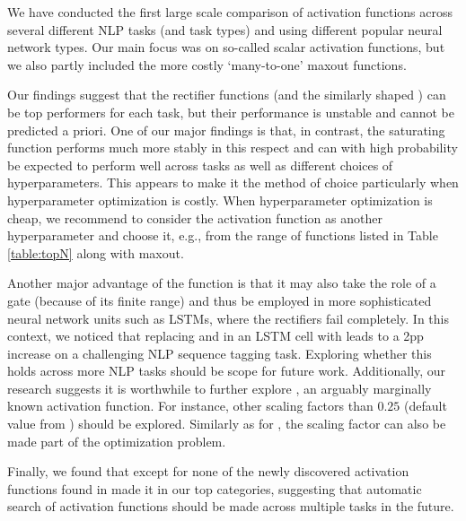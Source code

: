 %
We have conducted the first large scale comparison of activation functions across several different NLP tasks (and task types) and using different popular neural network types. 
Our main focus was on so-called scalar activation functions, but we also partly included the more costly `many-to-one' %
maxout functions. 

Our findings suggest that the rectifier functions (and the similarly shaped \swish{}) can be top performers for each task, but their performance is unstable and cannot be predicted a priori. One of our major findings is that, in contrast, the saturating \pentan{} function performs much more stably in this respect and can with high probability be expected to perform well across tasks as well as different choices of hyperparameters. This appears to make it the method of choice particularly when hyperparameter optimization is costly. When hyperparameter optimization is cheap, we recommend to consider the activation function as another hyperparameter and choose it, e.g., from the range of functions listed in Table \ref{table:topN} along with maxout. 

Another major advantage of the \pentan{} function is that it may also take the role of a gate (because of its finite range) and thus be employed in more sophisticated neural network units such as LSTMs, where the rectifiers fail completely. In this context, we noticed that replacing \sigmoid{} and \mytanh{} in an LSTM cell with \pentan{} leads to a 2pp increase on a challenging NLP sequence tagging task. Exploring whether this holds across more NLP tasks should be scope for future work. Additionally, our research suggests it is worthwhile to further explore \pentan{}, an arguably marginally known activation function. For instance, other scaling factors than $0.25$ (default value from \citet{Xu:2016}) should be explored. Similarly as for \prelu{}, the scaling factor can also be made part of the optimization problem. 

Finally, we found that except for \swish{} none of the newly discovered activation functions found in \citet{Ramach:2018} made it in our top categories, suggesting that automatic search of activation functions should be made across multiple tasks in the future. 